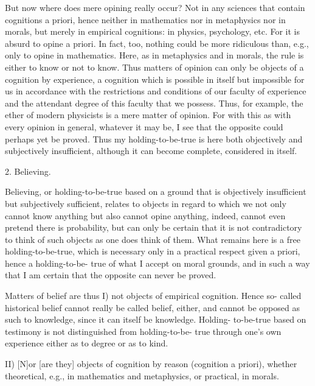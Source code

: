 But now where does mere opining really occur?
Not in any sciences that contain cognitions a priori,
hence neither in mathematics nor in metaphysics nor in morals,
but merely in empirical cognitions: in physics, psychology, etc.
For it is absurd to opine a priori.
In fact, too, nothing could be more ridiculous than, e.g.,
only to opine in mathematics.
Here, as in metaphysics and in morals,
the rule is either to know or not to know.
Thus matters of opinion can only be
objects of a cognition by experience,
a cognition which is possible in itself
but impossible for us in accordance
with the restrictions and conditions of
our faculty of experience
and the attendant degree of this faculty that we possess.
Thus, for example, the ether of modern physicists is
a mere matter of opinion.
For with this as with every opinion in general, whatever it may be,
I see that the opposite could perhaps yet be proved.
Thus my holding-to-be-true is here
both objectively and subjectively insufficient,
although it can become complete, considered in itself.

2. Believing.

Believing, or holding-to-be-true based on a ground that is
objectively insufficient but subjectively sufficient, relates to objects in
regard to which we not only cannot know anything but also cannot opine
anything, indeed, cannot even pretend there is probability, but can only be
certain that it is not contradictory to think of such objects as one does
think of them. What remains here is a free holding-to-be-true, which is
necessary only in a practical respect given a priori, hence a holding-to-be-
true of what I accept on moral grounds, and in such a way that I am certain
that the opposite can never be proved.

Matters of belief are thus
I) not objects of empirical cognition. Hence so-
called historical belief cannot really be called belief, either, and cannot be
opposed as such to knowledge, since it can itself be knowledge. Holding-
to-be-true based on testimony is not distinguished from holding-to-be-
true through one's own experience either as to degree or as to kind.

II) [N]or [are they] objects of cognition by reason (cognition a priori),
whether theoretical, e.g., in mathematics and metaphysics, or practical, in
morals.


